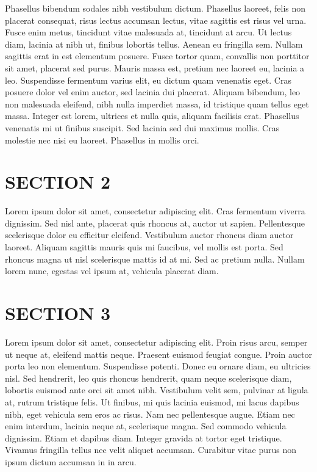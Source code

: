 \documentclass[10pt,peerreview,draftclsnofoot,onecolumn,final,margin=0.75in]{IEEEtran}
\begin{document}
Phasellus bibendum sodales nibh vestibulum dictum. Phasellus laoreet, felis non placerat consequat, risus lectus 
accumsan lectus, vitae sagittis est risus vel urna. Fusce enim metus, tincidunt vitae malesuada at, tincidunt 
at arcu. Ut lectus diam, lacinia at nibh ut, finibus lobortis tellus. Aenean eu fringilla sem. Nullam sagittis 
erat in est elementum posuere. Fusce tortor quam, convallis non porttitor sit amet, placerat sed purus. Mauris 
massa est, pretium nec laoreet eu, lacinia a leo. Suspendisse fermentum varius elit, eu dictum quam venenatis 
eget. Cras posuere dolor vel enim auctor, sed lacinia dui placerat. Aliquam bibendum, leo non malesuada eleifend, 
nibh nulla imperdiet massa, id tristique quam tellus eget massa. Integer est lorem, ultrices et nulla quis, 
aliquam facilisis erat. Phasellus venenatis mi ut finibus suscipit. Sed lacinia sed dui maximus mollis. Cras 
molestie nec nisi eu laoreet. Phasellus in mollis orci.

\section{SECTION 2}
Lorem ipsum dolor sit amet, consectetur adipiscing elit. Cras fermentum viverra dignissim. Sed nisl ante, placerat 
quis rhoncus at, auctor ut sapien. Pellentesque scelerisque dolor eu efficitur eleifend. Vestibulum auctor rhoncus 
diam auctor laoreet. Aliquam sagittis mauris quis mi faucibus, vel mollis est porta. Sed rhoncus magna ut nisl 
scelerisque mattis id at mi. Sed ac pretium nulla. Nullam lorem nunc, egestas vel ipsum at, vehicula placerat diam.

\section{SECTION 3}
Lorem ipsum dolor sit amet, consectetur adipiscing elit. Proin risus arcu, semper ut neque at, eleifend mattis neque. 
Praesent euismod feugiat congue. Proin auctor porta leo non elementum. Suspendisse potenti. Donec eu ornare diam, eu 
ultricies nisl. Sed hendrerit, leo quis rhoncus hendrerit, quam neque scelerisque diam, lobortis euismod ante orci 
sit amet nibh. Vestibulum velit sem, pulvinar at ligula at, rutrum tristique felis. Ut finibus, mi quis lacinia 
euismod, mi lacus dapibus nibh, eget vehicula sem eros ac risus. Nam nec pellentesque augue. Etiam nec enim interdum, 
lacinia neque at, scelerisque magna. Sed commodo vehicula dignissim. Etiam et dapibus diam. Integer gravida at tortor 
eget tristique. Vivamus fringilla tellus nec velit aliquet accumsan. Curabitur vitae purus non ipsum dictum accumsan 
in in arcu.
\end{document}
